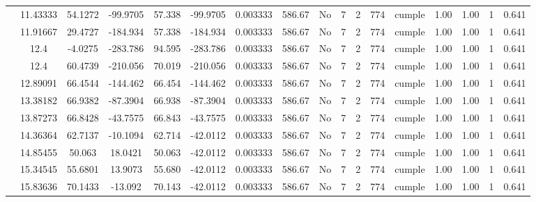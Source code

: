 \begin{table}[H]
{\begin{tabular}{|c|c|c|c|c|c|c|c|c|c|c|c|c|c|c|c|c|}
\cline{2-17}        & 11.43333 & 54.1272 & -99.9705 & 57.338 & -99.9705 & 0.003333 & 586.67 & No  & 7   & 2   & 774 & \cellcolor[rgb]{ .776,  .937,  .808}cumple & 1.00 & 1.00 & 1   & 0.641 \bigstrut\\
\cline{2-17}        & 11.91667 & 29.4727 & -184.934 & 57.338 & -184.934 & 0.003333 & 586.67 & No  & 7   & 2   & 774 & \cellcolor[rgb]{ .776,  .937,  .808}cumple & 1.00 & 1.00 & 1   & 0.641 \bigstrut\\
\cline{2-17}        & \cellcolor[rgb]{ .851,  .882,  .949}12.4 & -4.0275 & -283.786 & 94.595 & -283.786 & 0.003333 & 586.67 & No  & 7   & 2   & 774 & \cellcolor[rgb]{ .776,  .937,  .808}cumple & 1.00 & 1.00 & 1   & 0.641 \bigstrut\\
\cline{2-17}        & \cellcolor[rgb]{ .851,  .882,  .949}12.4 & 60.4739 & -210.056 & 70.019 & -210.056 & 0.003333 & 586.67 & No  & 7   & 2   & 774 & \cellcolor[rgb]{ .776,  .937,  .808}cumple & 1.00 & 1.00 & 1   & 0.641 \bigstrut\\
\cline{2-17}        & 12.89091 & 66.4544 & -144.462 & 66.454 & -144.462 & 0.003333 & 586.67 & No  & 7   & 2   & 774 & \cellcolor[rgb]{ .776,  .937,  .808}cumple & 1.00 & 1.00 & 1   & 0.641 \bigstrut\\
\cline{2-17}        & 13.38182 & 66.9382 & -87.3904 & 66.938 & -87.3904 & 0.003333 & 586.67 & No  & 7   & 2   & 774 & \cellcolor[rgb]{ .776,  .937,  .808}cumple & 1.00 & 1.00 & 1   & 0.641 \bigstrut\\
\cline{2-17}        & 13.87273 & 66.8428 & -43.7575 & 66.843 & -43.7575 & 0.003333 & 586.67 & No  & 7   & 2   & 774 & \cellcolor[rgb]{ .776,  .937,  .808}cumple & 1.00 & 1.00 & 1   & 0.641 \bigstrut\\
\cline{2-17}        & 14.36364 & 62.7137 & -10.1094 & 62.714 & -42.0112 & 0.003333 & 586.67 & No  & 7   & 2   & 774 & \cellcolor[rgb]{ .776,  .937,  .808}cumple & 1.00 & 1.00 & 1   & 0.641 \bigstrut\\
\cline{2-17}        & 14.85455 & 50.063 & 18.0421 & 50.063 & -42.0112 & 0.003333 & 586.67 & No  & 7   & 2   & 774 & \cellcolor[rgb]{ .776,  .937,  .808}cumple & 1.00 & 1.00 & 1   & 0.641 \bigstrut\\
\cline{2-17}        & 15.34545 & 55.6801 & 13.9073 & 55.680 & -42.0112 & 0.003333 & 586.67 & No  & 7   & 2   & 774 & \cellcolor[rgb]{ .776,  .937,  .808}cumple & 1.00 & 1.00 & 1   & 0.641 \bigstrut\\
\cline{2-17}        & 15.83636 & 70.1433 & -13.092 & 70.143 & -42.0112 & 0.003333 & 586.67 & No  & 7   & 2   & 774 & \cellcolor[rgb]{ .776,  .937,  .808}cumple & 1.00 & 1.00 & 1   & 0.641 \bigstrut\\

\end{tabular}}
\end{table}
